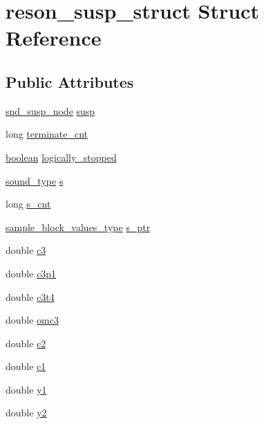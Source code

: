 \hypertarget{structreson__susp__struct}{}\section{reson\+\_\+susp\+\_\+struct Struct Reference}
\label{structreson__susp__struct}
\subsection*{Public Attributes}
\begin{DoxyCompactItemize}
\item 
\hyperlink{sound_8h_a6b268203688a934bd798ceb55f85d4c0}{snd\+\_\+susp\+\_\+node} \hyperlink{structreson__susp__struct_a46d946451ade0047d9975a5b099762e8}{susp}
\item 
long \hyperlink{structreson__susp__struct_a7dfa213f5843f61144d38dafb9babd99}{terminate\+\_\+cnt}
\item 
\hyperlink{cext_8h_a7670a4e8a07d9ebb00411948b0bbf86d}{boolean} \hyperlink{structreson__susp__struct_aa13087b9780f21de5fe679d7f5ce7281}{logically\+\_\+stopped}
\item 
\hyperlink{sound_8h_a792cec4ed9d6d636d342d9365ba265ea}{sound\+\_\+type} \hyperlink{structreson__susp__struct_a98af0b46b949618bb4e2bb614f90d67a}{s}
\item 
long \hyperlink{structreson__susp__struct_a1977a82d2a491bbe52c1bf25e93e9582}{s\+\_\+cnt}
\item 
\hyperlink{sound_8h_a83d17f7b465d1591f27cd28fc5eb8a03}{sample\+\_\+block\+\_\+values\+\_\+type} \hyperlink{structreson__susp__struct_ada8db7bbea4771ba91874abdc739f21e}{s\+\_\+ptr}
\item 
double \hyperlink{structreson__susp__struct_a7e73c8349f1a7912f579385a996326ae}{c3}
\item 
double \hyperlink{structreson__susp__struct_a7ed9da389fc8a8985340127ea5a61a5c}{c3p1}
\item 
double \hyperlink{structreson__susp__struct_a11dfcee72e3e6492ba48772beff018e8}{c3t4}
\item 
double \hyperlink{structreson__susp__struct_a42e2baa9e1257f633e683e76c6083953}{omc3}
\item 
double \hyperlink{structreson__susp__struct_af051dc892640a4cbca3b70be2c042d0f}{c2}
\item 
double \hyperlink{structreson__susp__struct_a6e1cc1a318a235e1e2f2d1e6c2774ca3}{c1}
\item 
double \hyperlink{structreson__susp__struct_a67d2d008b9b341dcd80f50cf6038f4d0}{y1}
\item 
double \hyperlink{structreson__susp__struct_ac924288c844adca0e4e3d14d4f5f8ae8}{y2}
\end{DoxyCompactItemize}


